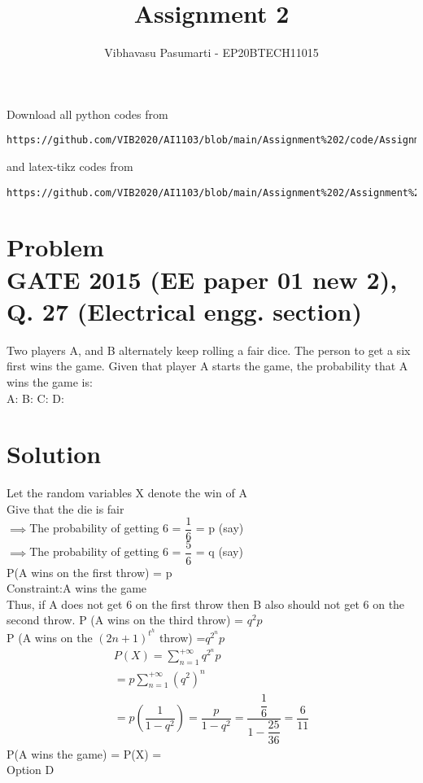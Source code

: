 \documentclass[journal,12pt,twocolumn]{IEEEtran}
\begin{document}
\title{Assignment 2}
\author{Vibhavasu Pasumarti - EP20BTECH11015}
\maketitle
\newpage
\bigskip
\renewcommand{\thefigure}{\theenumi}
\renewcommand{\thetable}{\theenumi}
Download all python codes from 
\begin{lstlisting}
https://github.com/VIB2020/AI1103/blob/main/Assignment%202/code/Assignment%202.py
\end{lstlisting}
%
and latex-tikz codes from 
%
\begin{lstlisting}
https://github.com/VIB2020/AI1103/blob/main/Assignment%202/Assignment%202.tex
\end{lstlisting}
\section{\Large Problem\\ \large GATE 2015 (EE paper 01 new 2), Q. 27 (Electrical engg. section)}

Two players A, and B alternately keep rolling a fair dice. The person to get a six first wins the game. Given that player A starts the game, the probability that A wins the game is:\\[5pt]
A: \hspace{1cm}
B: \hspace{1cm}
C: \hspace{1cm}
D: 
\section{\Large Solution}
Let the random variables X denote the win of A\\
Give that the die is fair\\
$\implies$The probability of getting 6 = $\dfrac{1}{6}$ = p (say)\\[5pt]
$\implies$The probability of getting 6 = $\dfrac{5}{6}$ = q (say)\\[5pt]
P(A wins on the first throw) = p\\[5pt]
\large Constraint:\normalsize A wins the game\\[5pt]
Thus, if A does not get 6 on the first throw then B also should not get 6 on the second throw.
P (A wins on the third throw) = $q^2 p$\\
\imples P (A wins on the $(2n + 1)^t^h $ throw) =\large $q^2^n p$\\[6pt]
\begin{align}
P(X) = \sum_{n=1}^{+\infty} q^2^n p \\[5pt]
= p \sum_{n=1}^{+\infty} (q^2)^n\\[5pt]
= p \left(\dfrac{1}{1 - q^2}\right) = \dfrac{p}{1 - q^2}
=\dfrac{\dfrac{1}{6}}{1 - \dfrac{25}{36}} = \dfrac{6}{11}
\end{align}
\centering
\Large P(A wins the game) = P(X) = \\[6pt]
Option D
\end{document}
